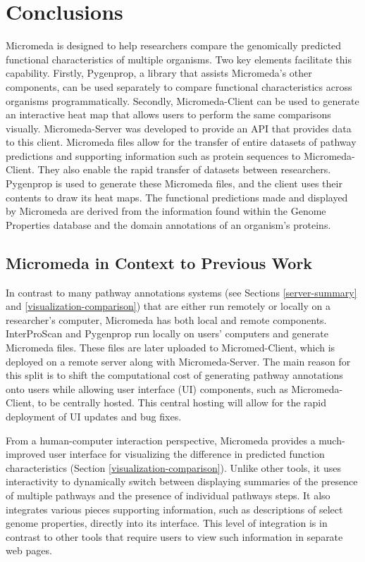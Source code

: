 \chapter{Conclusions} \label{conclusion-chapter}

Micromeda is designed to help researchers compare the genomically predicted functional characteristics of multiple organisms. Two key elements facilitate this capability. Firstly, Pygenprop, a library that assists Micromeda's other components, can be used separately to compare functional characteristics across organisms programmatically. Secondly, Micromeda-Client can be used to generate an interactive heat map that allows users to perform the same comparisons visually. Micromeda-Server was developed to provide an API that provides data to this client. Micromeda files allow for the transfer of entire datasets of pathway predictions and supporting information such as protein sequences to Micromeda-Client. They also enable the rapid transfer of datasets between researchers. Pygenprop is used to generate these Micromeda files, and the client uses their contents to draw its heat maps. The functional predictions made and displayed by Micromeda are derived from the information found within the Genome Properties database and the domain annotations of an organism's proteins. 

\section{Micromeda in Context to Previous Work}

In contrast to many pathway annotations systems (see Sections \ref{server-summary} and \ref{visualization-comparison}) that are either run remotely or locally on a researcher's computer, Micromeda has both local and remote components. InterProScan and Pygenprop run locally on users' computers and generate Micromeda files. These files are later uploaded to Micromed-Client, which is deployed on a remote server along with Micromeda-Server. The main reason for this split is to shift the computational cost of generating pathway annotations onto users while allowing user interface (UI) components, such as Micromeda-Client, to be centrally hosted. This central hosting will allow for the rapid deployment of UI updates and bug fixes.

From a human-computer interaction perspective, Micromeda provides a much-improved user interface for visualizing the difference in predicted function characteristics (Section \ref{visualization-comparison}). Unlike other tools, it uses interactivity to dynamically switch between displaying summaries of the presence of multiple pathways and the presence of individual pathways steps. It also integrates various pieces supporting information, such as descriptions of select genome properties, directly into its interface. This level of integration is in contrast to other tools that require users to view such information in separate web pages.

